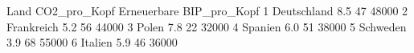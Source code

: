          Land CO2_pro_Kopf Erneuerbare BIP_pro_Kopf
1 Deutschland          8.5          47        48000
2  Frankreich          5.2          56        44000
3       Polen          7.8          22        32000
4     Spanien          6.0          51        38000
5    Schweden          3.9          68        55000
6     Italien          5.9          46        36000